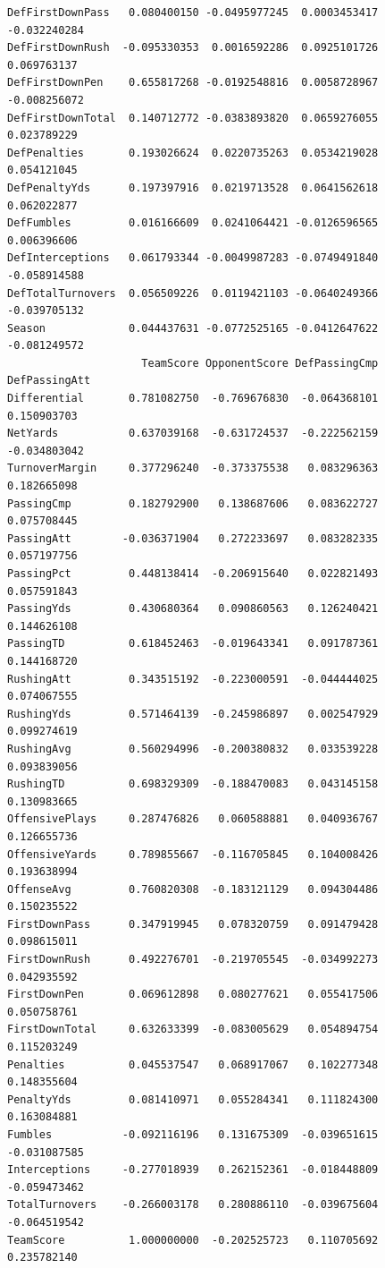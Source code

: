 \documentclass[
  letterpaper,
  DIV=11,
  numbers=noendperiod]{scrreprt}
\begin{document}
\begin{verbatim}
DefFirstDownPass   0.080400150 -0.0495977245  0.0003453417   -0.032240284
DefFirstDownRush  -0.095330353  0.0016592286  0.0925101726    0.069763137
DefFirstDownPen    0.655817268 -0.0192548816  0.0058728967   -0.008256072
DefFirstDownTotal  0.140712772 -0.0383893820  0.0659276055    0.023789229
DefPenalties       0.193026624  0.0220735263  0.0534219028    0.054121045
DefPenaltyYds      0.197397916  0.0219713528  0.0641562618    0.062022877
DefFumbles         0.016166609  0.0241064421 -0.0126596565    0.006396606
DefInterceptions   0.061793344 -0.0049987283 -0.0749491840   -0.058914588
DefTotalTurnovers  0.056509226  0.0119421103 -0.0640249366   -0.039705132
Season             0.044437631 -0.0772525165 -0.0412647622   -0.081249572
                     TeamScore OpponentScore DefPassingCmp DefPassingAtt
Differential       0.781082750  -0.769676830  -0.064368101   0.150903703
NetYards           0.637039168  -0.631724537  -0.222562159  -0.034803042
TurnoverMargin     0.377296240  -0.373375538   0.083296363   0.182665098
PassingCmp         0.182792900   0.138687606   0.083622727   0.075708445
PassingAtt        -0.036371904   0.272233697   0.083282335   0.057197756
PassingPct         0.448138414  -0.206915640   0.022821493   0.057591843
PassingYds         0.430680364   0.090860563   0.126240421   0.144626108
PassingTD          0.618452463  -0.019643341   0.091787361   0.144168720
RushingAtt         0.343515192  -0.223000591  -0.044444025   0.074067555
RushingYds         0.571464139  -0.245986897   0.002547929   0.099274619
RushingAvg         0.560294996  -0.200380832   0.033539228   0.093839056
RushingTD          0.698329309  -0.188470083   0.043145158   0.130983665
OffensivePlays     0.287476826   0.060588881   0.040936767   0.126655736
OffensiveYards     0.789855667  -0.116705845   0.104008426   0.193638994
OffenseAvg         0.760820308  -0.183121129   0.094304486   0.150235522
FirstDownPass      0.347919945   0.078320759   0.091479428   0.098615011
FirstDownRush      0.492276701  -0.219705545  -0.034992273   0.042935592
FirstDownPen       0.069612898   0.080277621   0.055417506   0.050758761
FirstDownTotal     0.632633399  -0.083005629   0.054894754   0.115203249
Penalties          0.045537547   0.068917067   0.102277348   0.148355604
PenaltyYds         0.081410971   0.055284341   0.111824300   0.163084881
Fumbles           -0.092116196   0.131675309  -0.039651615  -0.031087585
Interceptions     -0.277018939   0.262152361  -0.018448809  -0.059473462
TotalTurnovers    -0.266003178   0.280886110  -0.039675604  -0.064519542
TeamScore          1.000000000  -0.202525723   0.110705692   0.235782140

\end{verbatim}
\end{document}
